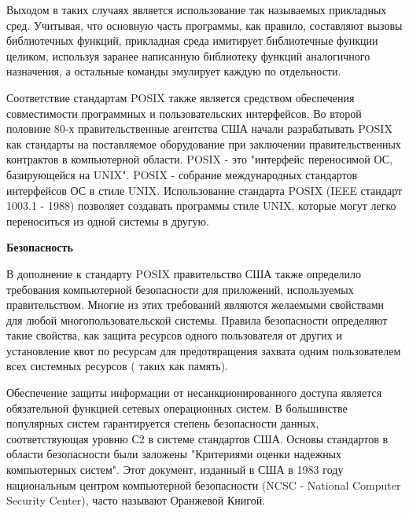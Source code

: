 Выходом в таких случаях является использование так называемых прикладных сред. Учитывая, что основную часть программы, как правило, составляют вызовы библиотечных функций, прикладная среда имитирует библиотечные функции целиком, используя заранее написанную библиотеку функций аналогичного назначения, а остальные команды эмулирует каждую по отдельности.

Соответствие стандартам POSIX также является средством обеспечения совместимости программных и пользовательских интерфейсов. Во второй половине 80-х правительственные агентства США начали разрабатывать POSIX как стандарты на поставляемое оборудование при заключении правительственных контрактов в компьютерной области. POSIX - это "интерфейс переносимой ОС, базирующейся на UNIX". POSIX - собрание международных стандартов интерфейсов ОС в стиле UNIX. Использование стандарта POSIX (IEEE стандарт 1003.1 - 1988) позволяет создавать программы стиле UNIX, которые могут легко переноситься из одной системы в другую.
\newline

\hypertarget{opr4_REQ}{\textbf{Безопасность}}

В дополнение к стандарту POSIX правительство США также определило требования компьютерной безопасности для приложений, используемых правительством. Многие из этих требований являются желаемыми свойствами для любой многопользовательской системы. Правила безопасности определяют такие свойства, как защита ресурсов одного пользователя от других и установление квот по ресурсам для предотвращения захвата одним пользователем всех системных ресурсов ( таких как память).

Обеспечение защиты информации от несанкционированного доступа является обязательной функцией сетевых операционных систем. В большинстве популярных систем гарантируется степень безопасности данных, соответствующая уровню С2 в системе стандартов США.
Основы стандартов в области безопасности были заложены "Критериями оценки надежных компьютерных систем". Этот документ, изданный в США в 1983 году национальным центром компьютерной безопасности (NCSC - National Computer Security Center), часто называют Оранжевой Книгой.

